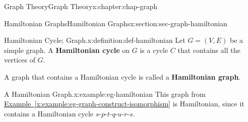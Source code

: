 \documentclass[oneside,10pt,]{book}
\newcommand{\xreffont}{\relax}
\newcommand{\terminology}[1]{\textbf{#1}}
\numberwithin{equation}{section}
\begin{document}
\begin{chapterptx}{Graph Theory}{}{Graph Theory}{}{}{x:chapter:chap-graph}
\begin{sectionptx}{Hamiltonian Graphs}{}{Hamiltonian Graphs}{}{}{x:section:sec-graph-hamiltonian}
\begin{definition}{Hamiltonian Cycle; Graph.}{x:definition:def-hamiltonian}%
Let \(G = (V,E)\) be a simple graph. A \terminology{Hamiltonian cycle} on \(G\) is a cycle \(C\) that contains all the vertices of \(G\).%
\par
A graph that contains a Hamiltonian cycle is called a \terminology{Hamiltonian graph}.%
\end{definition}
\begin{example}{A Hamiltonian Graph.}{x:example:eg-hamiltonian}%
This graph from \hyperref[x:example:eg-graph-construct-isomorphism]{Example~{\xreffont\ref{x:example:eg-graph-construct-isomorphism}}} is Hamiltonian, since it contains a Hamiltonian cycle \(s\)-\(p\)-\(t\)-\(q\)-\(u\)-\(r\)-\(s\).%
\begin{sidebyside}{1}{0.4}{0.4}{0}%
\begin{sbspanel}{0.2}%
\end{sbspanel}
\end{sidebyside}
\end{example}
\end{sectionptx}
\end{chapterptx}
\end{document}
